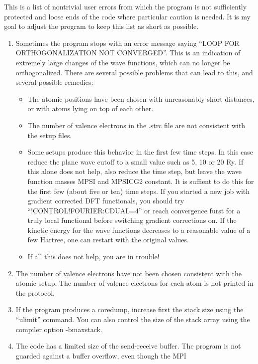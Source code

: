 \documentclass[final,12pt]{article}
\begin{document}
{{{This is a list of nontrivial user errors from which the program is not
sufficiently protected and loose ends of the code where particular
caution is needed. It is my goal to adjust the program to
keep this list as short as possible.

\begin{enumerate}
\item Sometimes the program stops with an error message saying 
  ``LOOP FOR ORTHOGONALIZATION NOT CONVERGED''. This is an indication
  of extremely large changes of the wave functions, which can no
  longer be orthogonalized. There are several possible problems that can
  lead to this, and several possible remedies: 
  \begin{itemize}
  \item The atomic positions have been chosen with unreasonably short
    distances, or with atoms lying on top of each other.
  \item The number of valence electrons in the .strc file are not
    consistent with the setup files.
  \item Some setups produce this behavior in the first few time steps.
    In this case reduce the plane wave cutoff to a small value such as
    5, 10 or 20 Ry. If this alone does not help, also reduce the time
    step, but leave the wave function masses MPSI and MPSICG2
    constant. It is suffient to do this for the first few (about five
    or ten) time steps. If you started a new job with gradient
    corrected DFT functionals, you should try
    ``!CONTROL!FOURIER:CDUAL=4'' or reach convergence furst for a
    truly local functional before switching gradient corrections
    on. If the kinetic energy for the wave functions decreases to a
    reasonable value of a few Hartree, one can restart with the
    original values.
  \item If all this does not help, you are in trouble!
  \end{itemize}
\item{The number of valence electrons have not been chosen consistent with
    the atomic setup. The number of valence electrons for each atom is
    not printed in the protocol.}
\item If the program produces a coredump, increase first the stack size
  using the ``ulimit'' command. You can also control the size of the stack
  array using the compiler option -bmaxstack.
\item The code has a limited size of the send-receive buffer. The
  program is not guarded against a buffer overflow, even though the MPI

\end{enumerate}}}}
\end{document}
